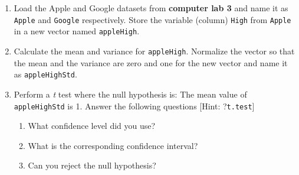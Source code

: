 \documentclass[a4paper]{article}
\begin{document}
\section{}
\begin{enumerate}
\item Load the Apple and Google datasets from \textbf{computer lab 3} and name
  it as \texttt{Apple} and \texttt{Google} respectively. Store the variable (column)
  \texttt{High} from \texttt{Apple} in a new vector named \texttt{appleHigh}.
  
\item Calculate the mean and variance for \texttt{appleHigh}. Normalize the vector
  so that the mean and the variance are zero and one for the  new vector and
  name it as \texttt{appleHighStd}.

\item Perform a \emph{t} test where the null hypothesis is: The mean value of
  \texttt{appleHighStd} is 1. Answer the following questions [Hint: ?\texttt{t.test}] 

  \begin{enumerate}
  \item What confidence level did you use?
  \item What is the corresponding confidence interval?
  \item Can you reject the null hypothesis?
  \end{enumerate}
\end{enumerate}
\end{document}
